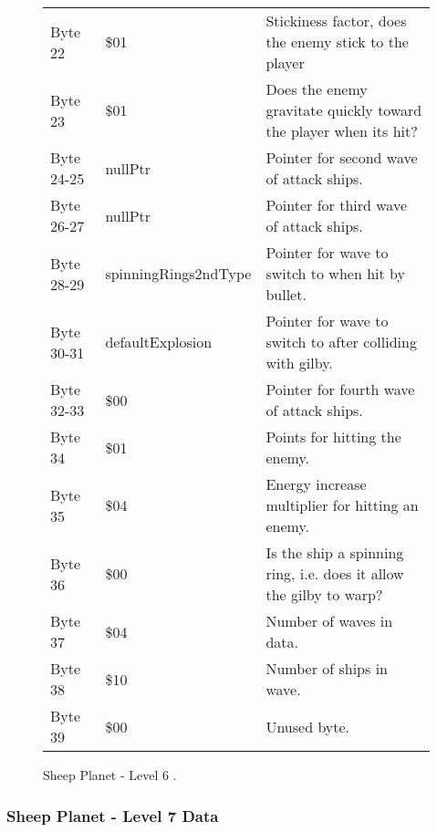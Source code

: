 \begin{figure}[H]
{\begin{adjustbox}{width=12cm}
\begin{tabular}{lll}
 Byte 22    & \$01                       & Stickiness factor, does the enemy stick to the player               \\
 Byte 23    & \$01                       & Does the enemy gravitate quickly toward the player when its hit?    \\
 Byte 24-25 & nullPtr                   & Pointer for second wave of attack ships.                            \\
 Byte 26-27 & nullPtr                   & Pointer for third wave of attack ships.                             \\
 Byte 28-29 & spinningRings2ndType      & Pointer for wave to switch to when hit by bullet.                   \\
 Byte 30-31 & defaultExplosion          & Pointer for  wave to switch to after colliding with gilby.          \\
 Byte 32-33 & \$00                       & Pointer for fourth wave of attack ships.                            \\
 Byte 34    & \$01                       & Points for hitting the enemy.                                       \\
 Byte 35    & \$04                       & Energy increase multiplier for hitting an enemy.                    \\
 Byte 36    & \$00                       & Is the ship a spinning ring, i.e. does it allow the gilby to warp?  \\
 Byte 37    & \$04                       & Number of waves in data.                                            \\
 Byte 38    & \$10                       & Number of ships in wave.                                            \\
 Byte 39    & \$00                       & Unused byte.                                                        \\
\bottomrule
\end{tabular}

  \end{adjustbox}

  }\caption*{Sheep Planet - Level 6
.}
\end{figure}

\clearpage
\subsubsection{Sheep Planet - Level 7 Data}

